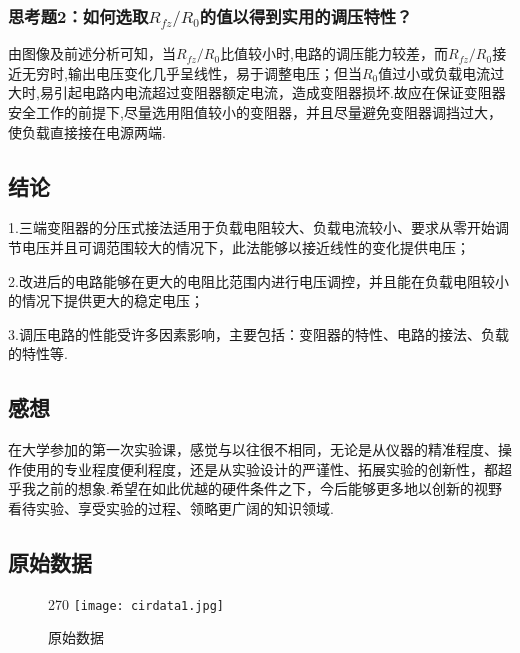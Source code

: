 \documentclass[12pt,a4paper,oneside,left=3.18,right=3.18,top=2.54,bottom=2.54]{ctexart}
\begin{document}
		\subsubsection{思考题2：如何选取$R_{fz}/R_0$的值以得到实用的调压特性？}
		由图像及前述分析可知，当$R_{fz}/R_0$比值较小时,电路的调压能力较差，而$R_{fz}/R_0$接近无穷时,输出电压变化几乎呈线性，易于调整电压；但当$R_0$值过小或负载电流过大时,易引起电路内电流超过变阻器额定电流，造成变阻器损坏.故应在保证变阻器安全工作的前提下,尽量选用阻值较小的变阻器，并且尽量避免变阻器调挡过大，使负载直接接在电源两端.\\
	\subsection{结论}
	1.三端变阻器的分压式接法适用于负载电阻较大、负载电流较小、要求从零开始调节电压并且可调范围较大的情况下，此法能够以接近线性的变化提供电压；\par
	2.改进后的电路能够在更大的电阻比范围内进行电压调控，并且能在负载电阻较小的情况下提供更大的稳定电压；\par
	3.调压电路的性能受许多因素影响，主要包括：变阻器的特性、电路的接法、负载的特性等.\par
	\subsection{感想}
	在大学参加的第一次实验课，感觉与以往很不相同，无论是从仪器的精准程度、操作使用的专业程度便利程度，还是从实验设计的严谨性、拓展实验的创新性，都超乎我之前的想象.希望在如此优越的硬件条件之下，今后能够更多地以创新的视野看待实验、享受实验的过程、领略更广阔的知识领域.

	
\newpage
\begin{appendices}
	\renewcommand{\thesection}{附录 \Alph{section}}
	\section{原始数据}
		\begin{figure}[H]
		\centering
		\begin{turn}{270}
		\texttt{[image: cirdata1.jpg]}
		\end{turn}
		\caption{原始数据}
		\label{figure5}
		\end{figure}
\end{appendices}
\end{document}
